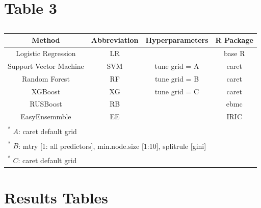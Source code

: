 \documentclass[
]{article}
\begin{document}
\newpage

\hypertarget{table-3}{%
\section{Table 3}\label{table-3}}

\begin{table}[!h]

\caption{\label{tab:tab:table} }
\centering
\begin{tabular}[t]{cccc}
\toprule
Method & Abbreviation & Hyperparameters & R Package\\
\midrule
Logistic Regression & LR &  & base R \cite{r}\\
\addlinespace
Support Vector Machine & SVM & tune grid = A & caret \cite{caret}\\
\addlinespace
Random Forest & RF & tune grid = B & caret \cite{caret}\\
\addlinespace
XGBoost & XG & tune grid = C & caret \cite{caret}\\
\addlinespace
RUSBoost & RB &  & ebmc \cite{ebmc}\\
\addlinespace
EasyEnsemmble & EE &  & IRIC \cite{iric}\\
\bottomrule
\multicolumn{4}{l}{\rule{0pt}{1em}\textsuperscript{*}     $A$: caret default grid}\\
\multicolumn{4}{l}{\rule{0pt}{1em}\textsuperscript{*}     $B$: mtry [1: all predictors], min.node.size [1:10], splitrule [gini]}\\
\multicolumn{4}{l}{\rule{0pt}{1em}\textsuperscript{*}     $C$: caret default grid}\\
\end{tabular}
\end{table}

\newpage

\hypertarget{results-tables}{%
\section{Results Tables}\label{results-tables}}
\end{document}

